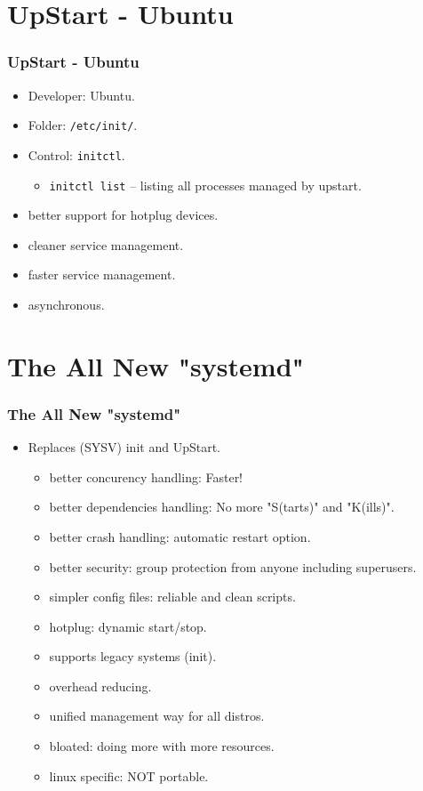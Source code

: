 \documentclass[xcolor=table, notheorems, hyperref={pdfpagelabels=false}]{beamer}
\begin{document}
\section{UpStart - Ubuntu}
\begin{frame}
\frametitle{UpStart - Ubuntu}
\begin{itemize}
\item Developer: Ubuntu.
\item Folder: \texttt{/etc/init/}.
\item Control: \texttt{initctl}.
\begin{itemize}
\item \texttt{initctl list} -- listing all processes managed by upstart.
\end{itemize}
\item better support for hotplug devices.
\item cleaner service management.
\item faster service management.
\item asynchronous.
\end{itemize}
\end{frame}

\section{The All New "systemd"}
\begin{frame}
\frametitle{The All New "systemd"}
\begin{itemize}
\item Replaces (SYSV) init and UpStart.
\begin{itemize}
\item better concurency handling: Faster!
\item better dependencies handling: No more "S(tarts)" and "K(ills)".
\item better crash handling: automatic restart option.
\item better security: group protection from anyone including superusers.
\item simpler config files: reliable and clean scripts.
\item hotplug: dynamic start/stop.
\item supports legacy systems (init).
\item overhead reducing.
\item unified management way for all distros.
\item bloated: doing more with more resources.
\item linux specific: NOT portable.
\end{itemize}
\end{itemize}
\end{frame}
\end{document}
